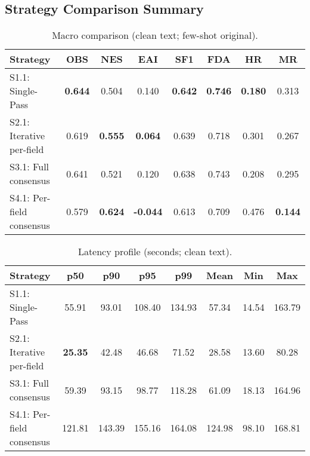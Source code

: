 \subsection{Strategy Comparison Summary}
\label{appendix:comparison}

\begin{table}[H]
 \centering
\caption{Macro comparison (clean text; few-shot original).}
\label{tab:strategy-comparison}
\begin{tabular}{lccccccc}
\toprule
 Strategy & OBS & NES & EAI & SF1 & FDA & HR & MR \\
\midrule
 S1.1: Single-Pass & \textbf{0.644} & 0.504 & 0.140 & \textbf{0.642} & \textbf{0.746} & \textbf{0.180} & 0.313 \\
 S2.1: Iterative per-field & 0.619 & \textbf{0.555} & \textbf{0.064} & 0.639 & 0.718 & 0.301 & 0.267 \\
 S3.1: Full consensus & 0.641 & 0.521 & 0.120 & 0.638 & 0.743 & 0.208 & 0.295 \\
 S4.1: Per-field consensus & 0.579 & \textbf{0.624} & \textbf{-0.044} & 0.613 & 0.709 & 0.476 & \textbf{0.144} \\
\bottomrule
\end{tabular}
\end{table}

\begin{table}[H]
 \centering
\caption{Latency profile (seconds; clean text).}
\label{tab:latency-comparison}
\begin{tabular}{lccccccc}
\toprule
 Strategy & p50 & p90 & p95 & p99 & Mean & Min & Max \\
\midrule
 S1.1: Single-Pass & 55.91 & 93.01 & 108.40 & 134.93 & 57.34 & 14.54 & 163.79 \\
 S2.1: Iterative per-field & \textbf{25.35} & 42.48 & 46.68 & 71.52 & 28.58 & 13.60 & 80.28 \\
 S3.1: Full consensus & 59.39 & 93.15 & 98.77 & 118.28 & 61.09 & 18.13 & 164.96 \\
 S4.1: Per-field consensus & 121.81 & 143.39 & 155.16 & 164.08 & 124.98 & 98.10 & 168.81 \\
\bottomrule
\end{tabular}
\end{table}